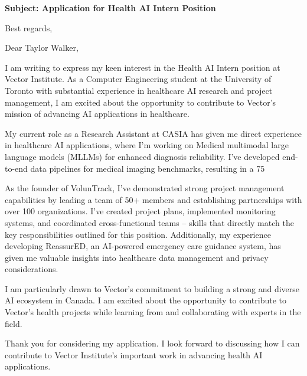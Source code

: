 \documentclass[11pt,a4paper,roman]{moderncv}
\begin{document}
\date{\today}
\opening{\textbf{Subject: Application for Health AI Intern Position}}
\closing{Best regards,}

\makelettertitle

Dear Taylor Walker,

I am writing to express my keen interest in the Health AI Intern position at Vector Institute. As a Computer Engineering student at the University of Toronto with substantial experience in healthcare AI research and project management, I am excited about the opportunity to contribute to Vector's mission of advancing AI applications in healthcare.

My current role as a Research Assistant at CASIA has given me direct experience in healthcare AI applications, where I'm working on Medical multimodal large language models (MLLMs) for enhanced diagnosis reliability. I've developed end-to-end data pipelines for medical imaging benchmarks, resulting in a 75%

As the founder of VolunTrack, I've demonstrated strong project management capabilities by leading a team of 50+ members and establishing partnerships with over 100 organizations. I've created project plans, implemented monitoring systems, and coordinated cross-functional teams – skills that directly match the key responsibilities outlined for this position. Additionally, my experience developing ReassurED, an AI-powered emergency care guidance system, has given me valuable insights into healthcare data management and privacy considerations.

I am particularly drawn to Vector's commitment to building a strong and diverse AI ecosystem in Canada. I am excited about the opportunity to contribute to Vector's health projects while learning from and collaborating with experts in the field.

Thank you for considering my application. I look forward to discussing how I can contribute to Vector Institute's important work in advancing health AI applications.

\makeletterclosing
\end{document}
